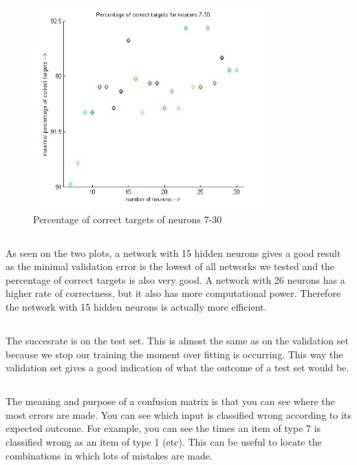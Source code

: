 \documentclass{scrartcl}
\begin{document}
 \begin{figure}[p]
    \centering
    \includegraphics[width=0.8\textwidth]{Plot_Correct_Targets.jpg}
    \caption{Percentage of correct targets of neurons 7-30}
    \label{fig:figure_2}
\end{figure}

\subsection{}
As seen on the two plots, a network with 15 hidden neurons gives a good result as the minimal validation error is the lowest of all networks we tested and the percentage of correct targets is also very good. A network with 26 neurons has a higher rate of correctness, but it also has more computational power. Therefore the network with 15 hidden neurons is actually more efficient.

\subsection{}
The succesrate is     on the test set. This is almost the same as on the validation set because we stop our training the moment over fitting is occurring. This way the validation set gives a good indication of what the outcome of a test set would be.

\subsection{}
The meaning and purpose of a confusion matrix is that you can see where the most errors are made. You can see which input is classified wrong according to its expected outcome. For example, you can see the times an item of type 7 is classified wrong as an item of type 1 (etc). This can be useful to locate the combinations in which lots of mistakes are made.
\end{document}
